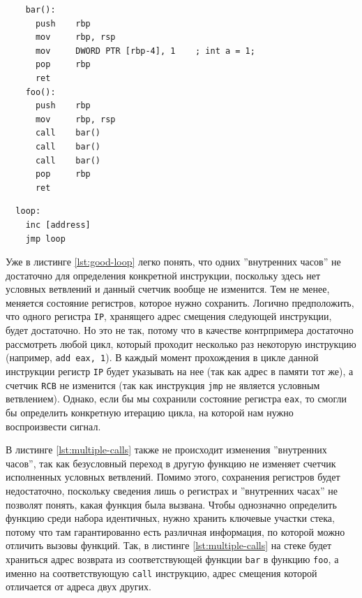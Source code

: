 \begin{codelisting}[H]
  \begin{verbatim}
    bar():
      push    rbp
      mov     rbp, rsp
      mov     DWORD PTR [rbp-4], 1    ; int a = 1;
      pop     rbp
      ret
    foo():
      push    rbp
      mov     rbp, rsp
      call    bar()
      call    bar()
      call    bar()
      pop     rbp
      ret
  \end{verbatim}
  \caption{Пример ассемблерного кода с необходимостью записи регистров и стека}
  \label{lst:multiple-calls}
\end{codelisting}

\begin{codelisting}[H]
\begin{verbatim}
  loop:
    inc [address]
    jmp loop
\end{verbatim}
  \caption{Пример ассемблерного кода, который RR не может воспроизвести}
  \label{lst:bad-loop}
\end{codelisting}

Уже в листинге \ref{lst:good-loop} легко понять, что одних ''внутренних часов''
не достаточно для определения конкретной инструкции, поскольку здесь нет
условных ветвлений и данный счетчик вообще не изменится. Тем не менее, меняется
состояние регистров, которое нужно сохранить. Логично предположить, что одного
регистра \texttt{IP}, хранящего адрес смещения следующей инструкции, будет
достаточно. Но это не так, потому что в качестве контрпримера достаточно
рассмотреть любой цикл, который проходит несколько раз некоторую инструкцию
(например, \texttt{add eax, 1}). В каждый момент прохождения в цикле данной
инструкции регистр \texttt{IP} будет указывать на нее (так как адрес в памяти
тот же), а счетчик \texttt{RCB} не изменится (так как инструкция \texttt{jmp}
не является условным ветвлением). Однако, если бы мы сохранили состояние
регистра \texttt{eax}, то смогли бы определить конкретную итерацию цикла, на
которой нам нужно воспроизвести сигнал.

В листинге \ref{lst:multiple-calls} также не происходит изменения ''внутренних
часов'', так как безусловный переход в другую функцию не изменяет счетчик
исполненных условных ветвлений. Помимо этого, сохранения регистров будет
недостаточно, поскольку сведения лишь о регистрах и ''внутренних часах'' не
позволят понять, какая функция была вызвана. Чтобы однозначно определить
функцию среди набора идентичных, нужно хранить ключевые участки стека, потому
что там гарантированно есть различная информация, по которой можно отличить
вызовы функций. Так, в листинге \ref{lst:multiple-calls} на стеке будет
храниться адрес возврата из соответствующей функции \texttt{bar} в функцию
\texttt{foo}, а именно на соответствующую \texttt{call} инструкцию, адрес
смещения которой отличается от адреса двух других.

